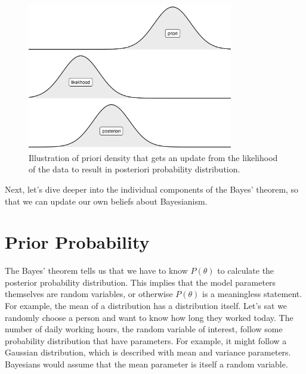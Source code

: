 \documentclass[
  10pt,
]{scrbook}
\begin{document}
\begin{figure}

{\centering \includegraphics[width=0.8\textwidth]{figures/bayesian-1} 

}

\caption{Illustration of priori density that gets an update from the likelihood of the data to result in posteriori probability distribution.}\label{fig:bayesian}
\end{figure}

Next, let's dive deeper into the individual components of the Bayes' theorem, so that we can update our own beliefs about Bayesianism.

\hypertarget{prior-probability}{%
\section{Prior Probability}\label{prior-probability}}

The Bayes' theorem tells us that we have to know \(P(\theta)\) to calculate the posterior probability distribution.
This implies that the model parameters themselves are random variables, or otherwise \(P(\theta)\) is a meaningless statement.
For example, the mean of a distribution has a distribution itself.
Let's sat we randomly choose a person and want to know how long they worked today.
The number of daily working hours, the random variable of interest, follow some probability distribution that have parameters.
For example, it might follow a Gaussian distribution, which is described with mean and variance parameters.
Bayesians would assume that the mean parameter is itself a random variable.
\end{document}
